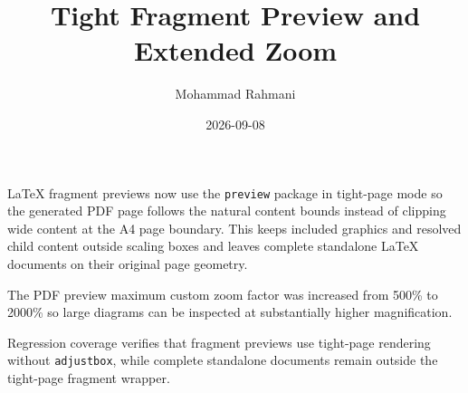 \documentclass[a4paper]{article}
\title{Tight Fragment Preview and Extended Zoom}
\date{2026-09-08}
\author{Mohammad Rahmani}
\begin{document}
   \maketitle

   LaTeX fragment previews now use the \texttt{preview} package in tight-page mode so the generated PDF page follows the natural content bounds instead of clipping wide content at the A4 page boundary. This keeps included graphics and resolved child content outside scaling boxes and leaves complete standalone LaTeX documents on their original page geometry.

   The PDF preview maximum custom zoom factor was increased from 500\% to 2000\% so large diagrams can be inspected at substantially higher magnification.

   Regression coverage verifies that fragment previews use tight-page rendering without \texttt{adjustbox}, while complete standalone documents remain outside the tight-page fragment wrapper.

   
   
\end{document}
